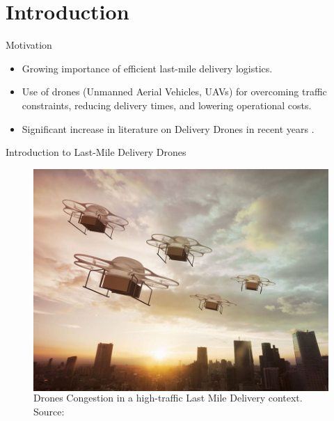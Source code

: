 \section{Introduction}

\begin{frame}{Motivation}
\begin{itemize}
    \item Growing importance of efficient last-mile delivery logistics.
    \item Use of drones (Unmanned Aerial Vehicles, UAVs) for overcoming traffic constraints, reducing delivery times, and lowering operational costs.
    \item Significant increase in literature on Delivery Drones in recent years \cite{DUKKANCI2023}.
\end{itemize}
\end{frame}

\begin{frame}{Introduction to Last-Mile Delivery Drones}
    \begin{figure}
      \begin{columns}
        \caption{Drones Congestion in a high-traffic Last Mile Delivery context. \\ Source: \cite{imageDronesCongestion}}
        \label{fig:example left}
        \includegraphics[width=\textwidth]{img/Drone Congestion.jpg}
      \end{columns}
    \end{figure}

\end{frame}

